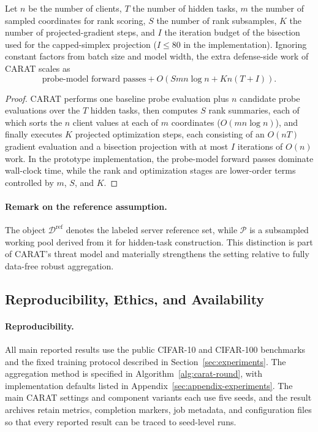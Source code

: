 \begin{proposition}
\label{prop:complexity}
Let $n$ be the number of clients, $T$ the number of hidden tasks, $m$ the number of sampled coordinates for rank scoring, $S$ the number of rank subsamples, $K$ the number of projected-gradient steps, and $I$ the iteration budget of the bisection used for the capped-simplex projection ($I\le 80$ in the implementation). Ignoring constant factors from batch size and model width, the extra defense-side work of CARAT scales as
\[
\text{probe-model forward passes} + O\!\left(Smn\log n + Kn(T+I)\right).
\]
\end{proposition}

\begin{proof}
CARAT performs one baseline probe evaluation plus $n$ candidate probe evaluations over the $T$ hidden tasks, then computes $S$ rank summaries, each of which sorts the $n$ client values at each of $m$ coordinates ($O(mn\log n)$), and finally executes $K$ projected optimization steps, each consisting of an $O(nT)$ gradient evaluation and a bisection projection with at most $I$ iterations of $O(n)$ work. In the prototype implementation, the probe-model forward passes dominate wall-clock time, while the rank and optimization stages are lower-order terms controlled by $m$, $S$, and $K$.
\end{proof}

\paragraph{Remark on the reference assumption.}
The object $\mathcal{D}^{\mathrm{ref}}$ denotes the labeled server reference set, while $\mathcal{P}$ is a subsampled working pool derived from it for hidden-task construction. This distinction is part of CARAT's threat model and materially strengthens the setting relative to fully data-free robust aggregation.

\subsection{Reproducibility, Ethics, and Availability}
\label{sec:appendix-reproducibility}

\paragraph{Reproducibility.}
All main reported results use the public CIFAR-10 and CIFAR-100 benchmarks and the fixed training protocol described in Section~\ref{sec:experiments}. The aggregation method is specified in Algorithm~\ref{alg:carat-round}, with implementation defaults listed in Appendix~\ref{sec:appendix-experiments}. The main CARAT settings and component variants each use five seeds, and the result archives retain metrics, completion markers, job metadata, and configuration files so that every reported result can be traced to seed-level runs.

